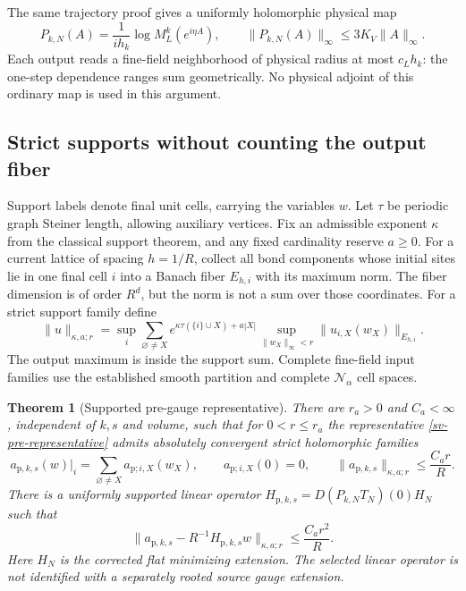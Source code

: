 \documentclass[11pt]{article}
\newtheorem{theorem}{Theorem}[section]
\theoremstyle{remark}
\begin{document}
The same trajectory proof gives a uniformly holomorphic physical map
\begin{equation}
 P_{k,N}(A)=\frac1{ih_k}\log M_L^k(e^{i\eta A}),\qquad
 \|P_{k,N}(A)\|_\infty\le 3K_V\|A\|_\infty.
 \label{sv-physical-prefix-map}
\end{equation}
Each output reads a fine-field neighborhood of physical radius at most
$c_Lh_k$: the one-step dependence ranges sum geometrically. No physical
adjoint of this ordinary map is used in this argument.

\subsection{Strict supports without counting the output fiber}
\label{sv-support-section}

Support labels denote final unit cells, carrying the variables $w$.
Let $\tau$ be periodic graph Steiner length, allowing auxiliary vertices.
Fix an admissible exponent $\kappa$ from the classical support theorem,
and any fixed cardinality reserve $a\ge0$. For a current lattice of
spacing $h=1/R$, collect all bond components whose initial sites lie in
one final cell $i$ into a Banach fiber $E_{h,i}$ with its maximum norm.
The fiber dimension is of order $R^d$, but the norm is not a sum over
those coordinates. For a strict support family define
\begin{equation}
 \|u\|_{\kappa,a;r}
 =\sup_i\sum_{\varnothing\ne X}
 e^{\kappa\tau(\{i\}\cup X)+a|X|}
 \sup_{\|w_X\|_\infty<r}\|u_{i,X}(w_X)\|_{E_{h,i}}.
 \label{sv-family-norm}
\end{equation}
The output maximum is inside the support sum. Complete fine-field input
families use the established smooth partition and complete
$\mathcal N_\alpha$ cell spaces.

\begin{theorem}[Supported pre-gauge representative]
\label{sv-support-theorem}
There are $r_a>0$ and $C_a<\infty$, independent of $k,s$ and volume,
such that for $0<r\le r_a$ the representative
\eqref{sv-pre-representative} admits absolutely convergent strict
holomorphic families
\begin{equation}
 a_{\mathrm p,k,s}(w)|_i
   =\sum_{\varnothing\ne X}a_{\mathrm p;i,X}(w_X),\qquad
 a_{\mathrm p;i,X}(0)=0,\qquad
 \|a_{\mathrm p,k,s}\|_{\kappa,a;r}\le \frac{C_ar}{R}.
 \label{sv-supported-amplitude}
\end{equation}
There is a uniformly supported linear operator
$H_{\mathrm p,k,s}=D(P_{k,N}T_N)(0)H_N$ such that
\begin{equation}
 \|a_{\mathrm p,k,s}-R^{-1}H_{\mathrm p,k,s}w\|_{\kappa,a;r}
       \le \frac{C_ar^2}{R}.
 \label{sv-supported-remainder}
\end{equation}
Here $H_N$ is the corrected flat minimizing extension. The selected
linear operator is not identified with a separately rooted source
gauge extension.
\end{theorem}
\end{document}
